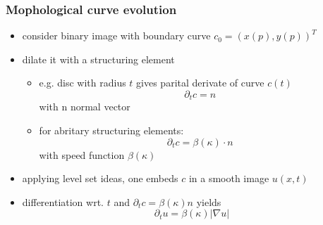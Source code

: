 \documentclass[11pt]{article}
\begin{document}
\subsubsection{Mophological curve evolution}
\label{sec-8-2-2}
\begin{itemize}
\item consider binary image with boundary curve $c_0 = (x(p),y(p))^T$
\item dilate it with a structuring element
\begin{itemize}
\item e.g. disc with radius $t$ gives parital derivate of curve $c(t)$
\[ \partial_t c = n \]
with n normal vector
\item for abritary structuring elements:
\[ \partial_t c = \beta(\kappa) \cdot n \]
with speed function $\beta(\kappa)$
\end{itemize}
\item applying level set ideas, one embeds $c$ in a smooth image $u(x,t)$
\item differentiation wrt. $t$ and $\partial_t c = \beta(\kappa)n$ yields
      \[ \partial_t u = \beta(\kappa)|\nabla u| \]
\end{itemize}
\end{document}
